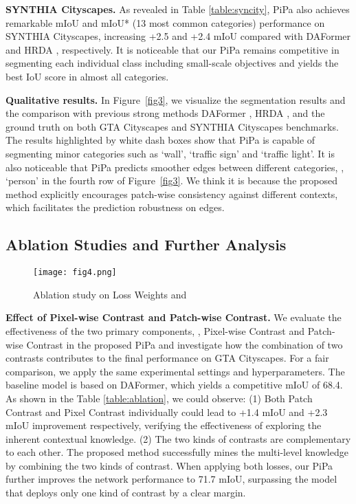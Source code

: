 \documentclass[10pt,twocolumn,letterpaper]{article}
\begin{document}
\noindent\textbf{SYNTHIA  Cityscapes.}
As revealed in Table \ref{table:syncity}, PiPa also achieves remarkable mIoU and mIoU* (13 most common categories) performance on SYNTHIA  Cityscapes, increasing +2.5 and +2.4 mIoU compared with DAFormer \cite{hoyer2022daformer} and HRDA \cite{hoyer2022hrda}, respectively. It is noticeable that our PiPa remains competitive in segmenting each individual class including small-scale objectives and yields the best IoU score in almost all categories.



\noindent\textbf{Qualitative results.}
In Figure~\ref{fig3}, we visualize the segmentation results and the comparison with previous strong methods DAFormer \cite{hoyer2022daformer}, HRDA \cite{hoyer2022hrda}, and the ground truth on both GTA  Cityscapes and SYNTHIA  Cityscapes benchmarks. The results highlighted by white dash boxes show that PiPa is capable of segmenting minor categories such as `wall', `traffic sign' and `traffic light'. It is also noticeable that PiPa predicts smoother edges between different categories, \eg, `person' in the fourth row of Figure~\ref{fig3}. We think it is because the proposed method explicitly encourages patch-wise consistency against different contexts, which facilitates the prediction robustness on edges.

\subsection{Ablation Studies and Further Analysis}

\begin{figure}[t]
  \centering
  \texttt{[image: fig4.png]}
  \vspace{-.2in}
  \caption{Ablation study on Loss Weights  and }
  \label{fig4}
\end{figure}



\noindent\textbf{Effect of Pixel-wise Contrast and Patch-wise Contrast.} 
We evaluate the effectiveness of the two primary components, \ie, Pixel-wise Contrast and Patch-wise Contrast in the proposed PiPa and investigate how the combination of two contrasts contributes to the final performance on GTA  Cityscapes. 
For a fair comparison, we apply the same experimental settings and hyperparameters. The baseline model is based on DAFormer, which yields a competitive mIoU of 68.4. 
As shown in the Table \ref{table:ablation}, we could observe: 
(1) Both Patch Contrast and Pixel Contrast individually could lead to +1.4 mIoU and +2.3 mIoU improvement respectively, verifying the effectiveness of exploring the inherent contextual knowledge. 
(2) The two kinds of contrasts are complementary to each other. The proposed method successfully mines the multi-level knowledge by combining the two kinds of contrast. When applying both losses, our PiPa further improves the network performance to 71.7 mIoU, surpassing the model that deploys only one kind of contrast by a clear margin. 
\end{document}
